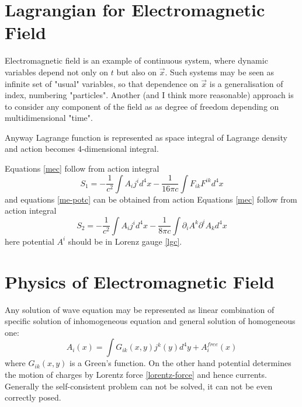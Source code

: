 \section{Lagrangian for Electromagnetic Field}
\label{lag-em}

Electromagnetic field is an example of continuous system, where
dynamic variables depend not only on $ t $ but also on $ \vec x $.
Such systems may be seen as infinite set of "usual" variables, so
that dependence on $ \vec x $ is a generalisation of index, numbering
"particles". Another (and I think more reasonable) approach is to
consider any component of the  field as as degree of freedom depending
on multidimensional "time".

Anyway Lagrange function is represented as space integral of 
Lagrange density and action becomes 4-dimensional integral.

Equations \eqref{mec} follow from action integral
\begin{equation}
   \label {em-ac-1}
    S_1=-\frac{1}{c^2} \int A_i j^i d^4 x-\frac{1}{16 \pi c} \int F_{ik} F^{ik} d^4 x
\end{equation}
and equations \eqref{me-potc} can be obtained from
action
Equations \eqref{mec} follow from action integral
\begin{equation}
   \label {em-ac-2}
    S_2=-\frac{1}{c^2} \int A_i j^i d^4 x-\frac{1}{8 \pi c} \int \partial_i A^k \partial^i A_k d^4 x 
\end{equation}
here potential $ A^i $ should be in Lorenz gauge \eqref{lgc}.

\section{Physics of Electromagnetic Field}
\label{phys-em}


Any solution of wave equation may be represented as linear combination of specific
solution of inhomogeneous equation and general solution of homogeneous one:
\begin{equation}
   \label {we-sol}
    A_i(x)=\int G_{ik}(x,y)j^k(y) d^4 y +A_i^{free} (x)
\end{equation}
where $  G_{ik}(x,y)$ is a Green's function.
On the other hand potential determines the motion of charges by Lorentz force \eqref{lorentz-force}
and hence currents. Generally the self-consistent problem can not be solved,
it can not be even correctly posed. 





